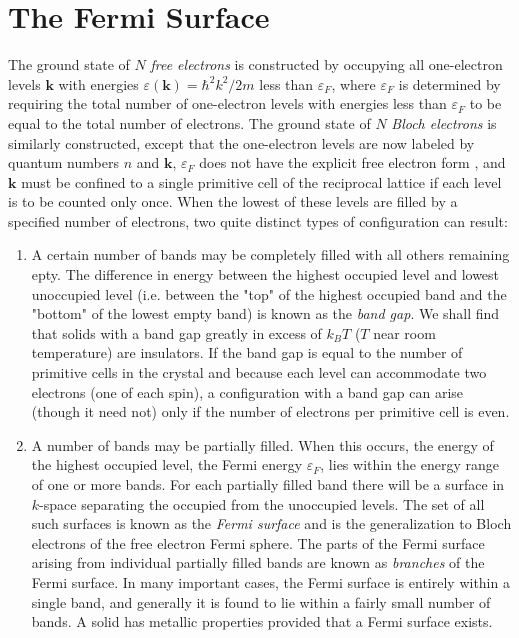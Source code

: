 \section{The Fermi Surface} 
	The ground state of $N$ \emph{free electrons}  is constructed by occupying all one-electron levels $\mathbf{k}$ with energies $\varepsilon (\mathbf{k}) = \hbar^2 k^2 / 2m$ less than $\varepsilon_F$, where $\varepsilon_F$ is determined by requiring the total number of one-electron levels with energies less than $\varepsilon_F$ to be equal to the total number of electrons. 
	The ground state of $N$ \emph{Bloch electrons} is similarly constructed, except that the one-electron levels are now labeled by quantum numbers $n$ and $\mathbf{k}$, $\varepsilon_F$ does not have the explicit free electron form , and $\mathbf{k}$ must be confined to a single primitive cell of the reciprocal lattice if each level is to be counted only once. When the lowest of these levels are filled by a specified number of electrons, two quite distinct types of configuration can result: 
	\begin{enumerate}
		\item A certain number of bands may be completely filled with all others remaining epty. The difference in energy between the highest occupied level and lowest unoccupied level (i.e. between the "top" of the highest occupied band and the "bottom" of the lowest empty band) is known as the \emph{band gap}. We shall find that solids with a band gap greatly in excess of $k_BT$ ($T$ near room temperature) are insulators. If the band gap is equal to the number of primitive cells in the crystal  and because each level can accommodate two electrons (one of each spin), a configuration with a band gap can arise (though it need not) only if the number of electrons per primitive cell is even. 
		\item A number of bands may be partially filled. When this occurs, the energy of the highest occupied level, the Fermi energy $\varepsilon_F$, lies within the energy range of one or more bands. For each partially filled band there will be a surface in $k$-space separating the occupied from the unoccupied levels. The set of all such surfaces is known as the \emph{Fermi surface} and is the generalization to Bloch electrons of the free electron Fermi sphere. The parts of the Fermi surface arising from individual partially filled bands are known as \emph{branches} of the Fermi surface. In many important cases, the Fermi surface is entirely within a single band, and generally it is found to lie within a fairly small number of bands.  A solid has metallic properties provided that a Fermi surface exists. 
	\end{enumerate}

